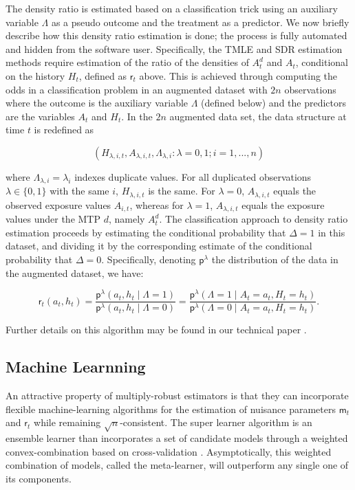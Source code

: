 \documentclass[twoside,11pt]{article}
\newcommand{\Q}{\mathsf{m}}
\renewcommand{\r}{\mathsf{r}}
\newcommand{\p}{\mathsf{p}}
\begin{document}
The density ratio is estimated based on a classification trick using an auxiliary variable $\Lambda$ as a pseudo outcome and the treatment as a predictor. We now briefly describe how this density ratio estimation is done; the process is fully automated and hidden from the software user. Specifically, the TMLE and SDR estimation methods require estimation of the ratio of the densities of $A_t^d$ and $A_t$, conditional on the history $H_t$, defined as $\r_t$ above. This is achieved through computing the odds in a classification problem in an augmented dataset with $2n$ observations where the outcome is the auxiliary variable $\Lambda$ (defined below) and the predictors are the variables $A_t$ and $H_t$. In the $2n$ augmented data set, the data structure at time $t$ is redefined as

\begin{equation}
(H_{\lambda, i, t}, A_{\lambda, i, t}, \Lambda_{\lambda, i} : \lambda = 0, 1; i = 1, ..., n)
\end{equation}

where $\Lambda_{\lambda, i} = \lambda_i$ indexes duplicate values. For all duplicated observations $\lambda\in\{0,1\}$ with the same $i$, $H_{\lambda, i, t}$ is the same. For $\lambda = 0$, $A_{\lambda, i, t}$ equals the observed exposure values $A_{i, t}$, whereas for $\lambda=1$, $A_{\lambda, i, t}$ equals the exposure values under the MTP $d$, namely $A^{d}_t$. The classification approach to density ratio estimation proceeds by estimating the conditional probability that $\Delta=1$ in this dataset, and dividing it by the corresponding estimate of the conditional probability that $\Delta=0$. Specifically, denoting $\p^\lambda$ the distribution of the data in the augmented dataset, we have:

\[\r_t(a_t, h_t) = \frac{\p^\lambda(a_t, h_t \mid \Lambda =
    1)}{\p^\lambda(a_t, h_t \mid \Lambda =
    0)}=\frac{\p^\lambda(\Lambda = 1\mid A_t=a_t,
    H_t=h_t)}{\p^\lambda(\Lambda = 0\mid A_t=a_t, H_t=h_t)}.\] 
    
Further details on this algorithm may be found in our technical paper \citep{jasaLMTP}.

\hypertarget{machine-learning}{\subsection{Machine Learnning}\label{machine-learning}}

An attractive property of multiply-robust estimators is that they can incorporate flexible machine-learning algorithms for the estimation of nuisance parameters $\Q_t$ and $\r_t$ while remaining $\sqrt{n}$-consistent. The super learner algorithm is an ensemble learner than incorporates a set of candidate models through a weighted convex-combination based on cross-validation \citep{laanSuperLearner2007}. Asymptotically, this weighted combination of models, called the meta-learner, will outperform any single one of its components.
\end{document}
